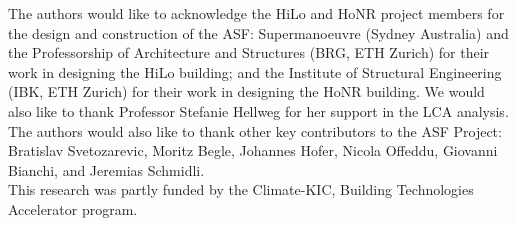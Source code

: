 
The authors would like to acknowledge the HiLo and HoNR project members for the design and construction of the ASF: Supermanoeuvre (Sydney Australia) and the Professorship of Architecture and Structures (BRG, ETH Zurich) for their work in designing the HiLo building; and the Institute of Structural Engineering (IBK, ETH Zurich) for their work in designing the HoNR building. We would also like to thank Professor Stefanie Hellweg for her support in the LCA analysis. The authors would also like to thank other key contributors to the ASF Project: Bratislav Svetozarevic, Moritz Begle, Johannes Hofer, Nicola Offeddu, Giovanni Bianchi, and Jeremias Schmidli. \\

This research was partly funded by the Climate-KIC, Building Technologies Accelerator program.
